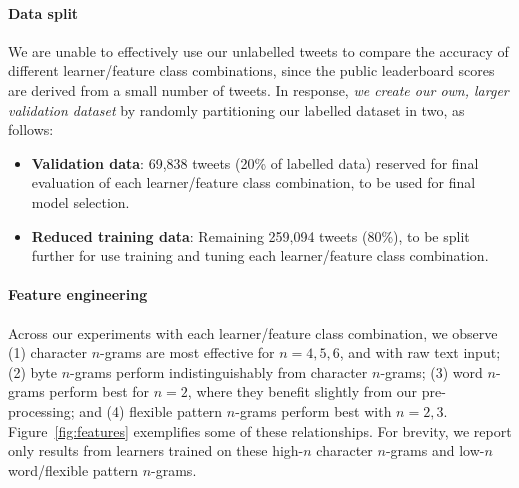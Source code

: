 \documentclass[twocolumn,10pt]{article}
\begin{document}
\paragraph{Data split}

We
are unable to effectively use our unlabelled tweets to compare
the accuracy of different learner/feature class combinations,
since the public leaderboard scores are derived from a small
number of tweets.
In response, \emph{we create our own, larger validation dataset}
by randomly partitioning our labelled dataset in two, as follows:

\begin{itemize}[itemsep=0pt,topsep=0pt]
    \item \textbf{Validation data}: 69,838 tweets (20\% of labelled data)
    reserved for final evaluation of each learner/feature class combination,
    to be used for final model selection.
    \item \textbf{Reduced training data}: Remaining 259,094 tweets (80\%),
    to be split further for use training and tuning each learner/feature
    class combination.
\end{itemize}


\paragraph{Feature engineering}

Across our experiments with each learner/feature class combination,
we observe
(1) character $n$-grams are most effective for $n=4,5,6$, and with raw
    text input;
(2) byte $n$-grams perform indistinguishably from character $n$-grams;
(3) word $n$-grams perform best for $n=2$, where they benefit slightly
    from our pre-processing; and
(4) flexible pattern $n$-grams perform best with $n=2,3$.
Figure~\ref{fig:features} exemplifies some of these relationships.
For brevity, we report only results from learners trained on these
high-$n$ character $n$-grams and low-$n$ word/flexible pattern $n$-grams.
\end{document}
